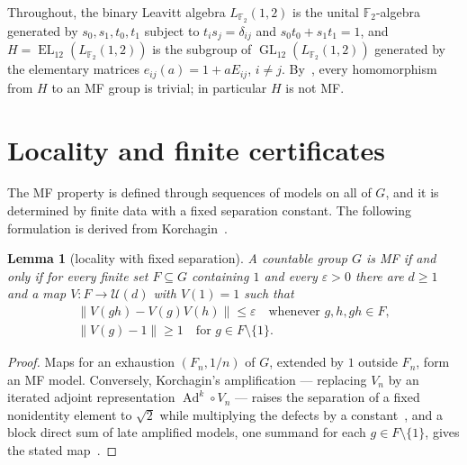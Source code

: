 \documentclass[11pt]{amsart}
\newcommand{\leanverified}[2]{\ignorespaces}
\newtheorem{lemma}[theorem]{Lemma}
\theoremstyle{remark}
\theoremstyle{plain}
\newcommand{\F}{\mathbb F}
\newcommand{\GL}{\operatorname{GL}}
\newcommand{\EL}{\operatorname{EL}}
\newcommand{\U}{\mathcal U}
\newcommand{\opnorm}[1]{\left\lVert #1\right\rVert}
\begin{document}
Throughout, the binary Leavitt algebra $L_{\F_2}(1,2)$ is the unital
$\F_2$-algebra generated by $s_0,s_1,t_0,t_1$ subject to $t_is_j=\delta_{ij}$
and $s_0t_0+s_1t_1=1$, and $H=\EL_{12}(L_{\F_2}(1,2))$ is the subgroup of
$\GL_{12}(L_{\F_2}(1,2))$ generated by the elementary matrices
$e_{ij}(a)=1+aE_{ij}$, $i\ne j$.  By~\cite[Theorem~B]{NonMF}, every
homomorphism from $H$ to an MF group is trivial; in particular $H$ is not
MF\@.

\section{Locality and finite certificates}\label{sec:local}

The MF property is defined through sequences of models on all of $G$,
and it is determined by finite data with a fixed separation constant.  The
following formulation is derived from
Korchagin~\cite[Propositions~5 and~7]{Korchagin}.

\begin{lemma}[locality with fixed separation]\label{lem:local-models}
A countable group $G$ is MF if and only if for every finite set
$F\subseteq G$ containing $1$ and every $\varepsilon>0$ there are $d\ge1$
and a map $V\colon F\to\U(d)$ with $V(1)=1$ such that
\begin{gather*}
 \opnorm{V(gh)-V(g)V(h)}\le\varepsilon\quad\text{whenever }g,h,gh\in F,\\
 \opnorm{V(g)-1}\ge1\quad\text{for }g\in F\setminus\{1\}.
\end{gather*}
\leanverified{Sofic/OperatorMFLocalNormalization}{GroupApproximation.OperatorMFLocalNormalization.isOperatorMF_iff_isNormApproximable_one}
\end{lemma}

\begin{proof}
Maps for an exhaustion $(F_n,1/n)$ of $G$, extended by $1$ outside
$F_n$, form an MF model.  Conversely, Korchagin's amplification --- replacing
$V_n$ by an iterated adjoint representation $\operatorname{Ad}^k\circ V_n$
--- raises the separation of a fixed nonidentity element to $\sqrt2$ while
multiplying the defects by a constant~\cite[Proposition~5]{Korchagin}, and a
block direct sum of late amplified models, one summand for each
$g\in F\setminus\{1\}$, gives the stated map~\cite[Proposition~7]{Korchagin}.
\end{proof}
\end{document}
